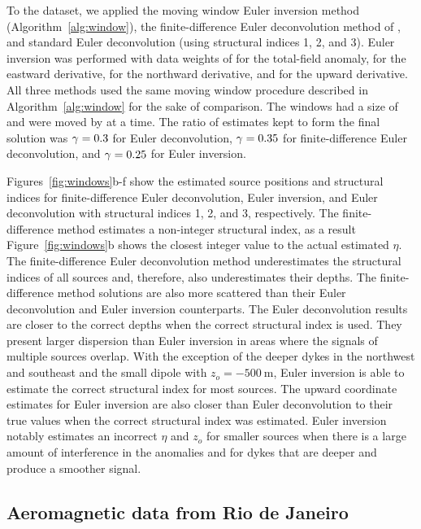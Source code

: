 To the dataset, we applied the moving window Euler inversion method (Algorithm~\ref{alg:window}), the finite-difference Euler deconvolution method of \citet{Gerovska2005}, and standard Euler deconvolution (using structural indices 1, 2, and 3).
Euler inversion was performed with data weights of \DefaultWeightsF{} for the total-field anomaly, \DefaultWeightsE{} for the eastward derivative, \DefaultWeightsN{} for the northward derivative, and \DefaultWeightsU{} for the upward derivative.
All three methods used the same moving window procedure described in Algorithm~\ref{alg:window} for the sake of comparison.
The windows had a size of \SynWinWindowSize{} and were moved by \SynWinWindowStep{} at a time.
The ratio of estimates kept to form the final solution was $\gamma=0.3$ for Euler deconvolution, $\gamma=0.35$ for finite-difference Euler deconvolution, and $\gamma=0.25$ for Euler inversion.

Figures~\ref{fig:windows}b-f show the estimated source positions and structural indices for finite-difference Euler deconvolution, Euler inversion, and Euler deconvolution with structural indices 1, 2, and 3, respectively.
The finite-difference method estimates a non-integer structural index, as a result Figure~\ref{fig:windows}b shows the closest integer value to the actual estimated $\eta$.
The finite-difference Euler deconvolution method underestimates the structural indices of all sources and, therefore, also underestimates their depths.
The finite-difference method solutions are also more scattered than their Euler deconvolution and Euler inversion counterparts.
The Euler deconvolution results are closer to the correct depths when the correct structural index is used.
They present larger dispersion than Euler inversion in areas where the signals of multiple sources overlap.
With the exception of the deeper dykes in the northwest and southeast and the small dipole with $z_o=\qty{-500}{\m}$, Euler inversion is able to estimate the correct structural index for most sources.
The upward coordinate estimates for Euler inversion are also closer than Euler deconvolution to their true values when the correct structural index was estimated.
Euler inversion notably estimates an incorrect $\eta$ and $z_o$ for smaller sources when there is a large amount of interference in the anomalies and for dykes that are deeper and produce a smoother signal.


\subsection{Aeromagnetic data from Rio de Janeiro}
\label{sec:rio}

